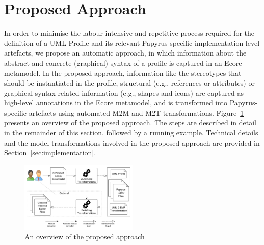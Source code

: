 \section{Proposed Approach}
\label{sec:approach}

In order to minimise the labour intensive and repetitive process required for the definition of a UML Profile and its relevant Papyrus-specific implementation-level artefacts, we propose an automatic approach, in which information about the abstract and concrete (graphical) syntax of a profile is captured in an Ecore metamodel. In the proposed approach, information like the stereotypes that should be instantiated in the profile, structural (e.g., references or attributes) or graphical syntax related information (e.g., shapes and icons) are captured as high-level annotations in the Ecore metamodel, and is transformed into Papyrus-specific artefacts using automated M2M and M2T transformations. Figure~\ref{fig:approachOverview} presents an overview of the proposed approach. The steps are described in detail in the remainder of this section, followed by a running example. Technical details and the model transformations involved in the proposed approach are provided in Section~\ref{sec:implementation}.

\begin{figure}[t]
	\centering
	\includegraphics[width=0.5\textwidth]{diagrams/approachOverview.pdf}
	\caption[]{An overview of the proposed approach}
	\label{fig:approachOverview}
	\vspace{-6mm}
\end{figure}

